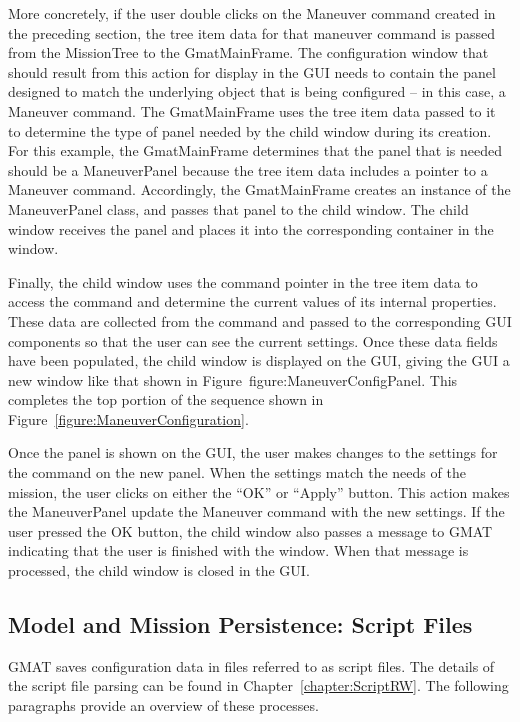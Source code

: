 More concretely, if the user double clicks on the Maneuver command created in the preceding
section, the tree item data for that maneuver command is passed from the MissionTree to the
GmatMainFrame.  The configuration window that should result from this action for display in the GUI
needs to contain the panel designed to match the underlying object that is being configured -- in
this case, a Maneuver command.  The GmatMainFrame uses the tree item data passed to it to determine
the type of panel needed by the child window during its creation. For this example, the
GmatMainFrame determines that the panel that is needed should be a ManeuverPanel because the tree
item data includes a pointer to a Maneuver command.  Accordingly, the GmatMainFrame creates an
instance of the ManeuverPanel class, and passes that panel to the child window.  The child window
receives the panel and places it into the corresponding container in the window.

Finally, the child window uses the command pointer in the tree item data to access the command and
determine the current values of its internal properties.  These data are collected from the command
and passed to the corresponding GUI components so that the user can see the current settings. Once
these data fields have been populated, the child window is displayed on the GUI, giving the GUI a
new window like that shown in Figure~{figure:ManeuverConfigPanel}.  This completes the top portion
of the sequence shown in Figure~\ref{figure:ManeuverConfiguration}.

Once the panel is shown on the GUI, the user makes changes to the settings for the command on the
new panel.  When the settings match the needs of the mission, the user clicks on either the ``OK''
or ``Apply'' button.  This action makes the ManeuverPanel update the Maneuver command with the new
settings.  If the user pressed the OK button, the child window also passes a message to GMAT
indicating that the user is finished with the window.  When that message is processed, the child
window is closed in the GUI.

\subsection{Model and Mission Persistence: Script Files}

GMAT saves configuration data in files referred to as script files.  The details of the script file
parsing can be found in Chapter~\ref{chapter:ScriptRW}.  The following paragraphs provide an
overview of these processes.

